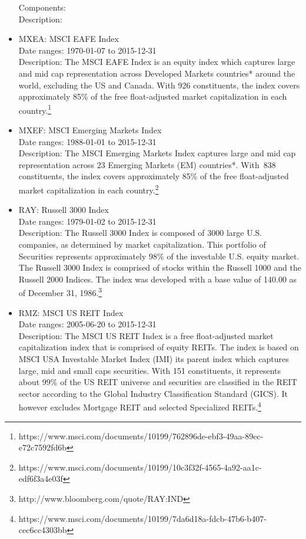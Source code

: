 \documentclass[12pt]{article}
\begin{document}
\begin{itemize}
Components: \\
Description:
\item MXEA: MSCI EAFE Index \\
Date ranges: 1970-01-07 to 2015-12-31 \\
Description: The MSCI EAFE Index is an equity index which captures large and mid cap representation across Developed Markets countries* around
the world, excluding the US and Canada. With 926 constituents, the index covers approximately 85\% of the free float-adjusted market
capitalization in each country.\footnote{https://www.msci.com/documents/10199/762896de-ebf3-49aa-89ec-e72c7592fd6b}
\item MXEF: MSCI Emerging Markets Index\\
Date ranges: 1988-01-01 to 2015-12-31 \\
Description: The MSCI Emerging Markets Index captures large and mid cap representation across 23 Emerging Markets (EM) countries*. With 838
constituents, the index covers approximately 85\% of the free float-adjusted market capitalization in each country.\footnote{https://www.msci.com/documents/10199/10c3f32f-4565-4a92-aa1c-edf6f3a4e03f}
\item RAY: Russell 3000 Index\\
Date ranges: 1979-01-02 to 2015-12-31 \\
Description: The Russell 3000 Index is composed of 3000 large U.S. companies, as determined by market capitalization. This portfolio of Securities represents approximately 98\% of the investable U.S. equity market. The Russell 3000 Index is comprised of stocks within the Russell 1000 and the Russell 2000 Indices. The index was developed with a base value of 140.00 as of December 31, 1986.\footnote{http://www.bloomberg.com/quote/RAY:IND}
\item RMZ: MSCI US REIT Index\\
Date ranges: 2005-06-20 to 2015-12-31 \\
Description: The MSCI US REIT Index is a free float-adjusted market capitalization index that is comprised of equity REITs. The index is based on MSCI
USA Investable Market Index (IMI) its parent index which captures large, mid and small caps securities. With 151 constituents, it represents
about 99\% of the US REIT universe and securities are classified in the REIT sector according to the Global Industry Classification Standard
(GICS). It however excludes Mortgage REIT and selected Specialized REITs.\footnote{https://www.msci.com/documents/10199/7da6d18a-fdcb-47b6-b407-cec6cc4303bb}

\end{itemize}
\end{document}
